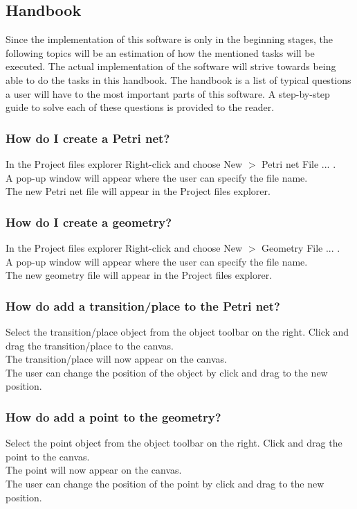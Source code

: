 \subsection{Handbook}
Since the implementation of this software is only in the beginning stages, the following topics will be an estimation of how the mentioned tasks will be executed. The actual implementation of the software will strive towards being able to do the tasks in this handbook. 
The handbook is a list of typical questions a user will have to the most important parts of this software. A step-by-step guide to solve each of these questions is provided to the reader.

\subsubsection{How do I create a Petri net?}
In the Project files explorer Right-click and choose New $>$ Petri net File ... . \\
A pop-up window will appear where the user can specify the file name. \\
The new Petri net file will appear in the Project files explorer.   

\subsubsection{How do I create a geometry?}
In the Project files explorer Right-click and choose New $>$ Geometry File ... .  \\
A pop-up window will appear where the user can specify the file name. \\
The new geometry file will appear in the Project files explorer.   

\subsubsection{How do add a transition/place to the Petri net?}
Select the transition/place object from the object toolbar on the right. Click and drag the transition/place to the canvas. \\
The transition/place will now appear on the canvas. \\
The user can change the position of the object by click and drag to the new position.

\subsubsection{How do add a point to the geometry?}
Select the point object from the object toolbar on the right. Click and drag the point to the canvas. \\
The point will now appear on the canvas. \\
The user can change the position of the point by click and drag to the new position.


